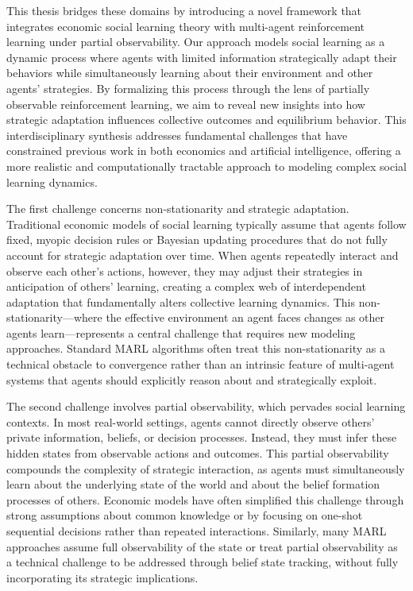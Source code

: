 \documentclass[a4paper,12pt]{report}
\begin{document}
This thesis bridges these domains by introducing a novel framework that integrates economic social learning theory with multi-agent reinforcement learning under partial observability. Our approach models social learning as a dynamic process where agents with limited information strategically adapt their behaviors while simultaneously learning about their environment and other agents' strategies. By formalizing this process through the lens of partially observable reinforcement learning, we aim to reveal new insights into how strategic adaptation influences collective outcomes and equilibrium behavior. This interdisciplinary synthesis addresses fundamental challenges that have constrained previous work in both economics and artificial intelligence, offering a more realistic and computationally tractable approach to modeling complex social learning dynamics.

The first challenge concerns non-stationarity and strategic adaptation. Traditional economic models of social learning typically assume that agents follow fixed, myopic decision rules or Bayesian updating procedures that do not fully account for strategic adaptation over time. When agents repeatedly interact and observe each other's actions, however, they may adjust their strategies in anticipation of others' learning, creating a complex web of interdependent adaptation that fundamentally alters collective learning dynamics. This non-stationarity—where the effective environment an agent faces changes as other agents learn—represents a central challenge that requires new modeling approaches. Standard MARL algorithms often treat this non-stationarity as a technical obstacle to convergence rather than an intrinsic feature of multi-agent systems that agents should explicitly reason about and strategically exploit.

The second challenge involves partial observability, which pervades social learning contexts. In most real-world settings, agents cannot directly observe others' private information, beliefs, or decision processes. Instead, they must infer these hidden states from observable actions and outcomes. This partial observability compounds the complexity of strategic interaction, as agents must simultaneously learn about the underlying state of the world and about the belief formation processes of others. Economic models have often simplified this challenge through strong assumptions about common knowledge or by focusing on one-shot sequential decisions rather than repeated interactions. Similarly, many MARL approaches assume full observability of the state or treat partial observability as a technical challenge to be addressed through belief state tracking, without fully incorporating its strategic implications.
\end{document}
